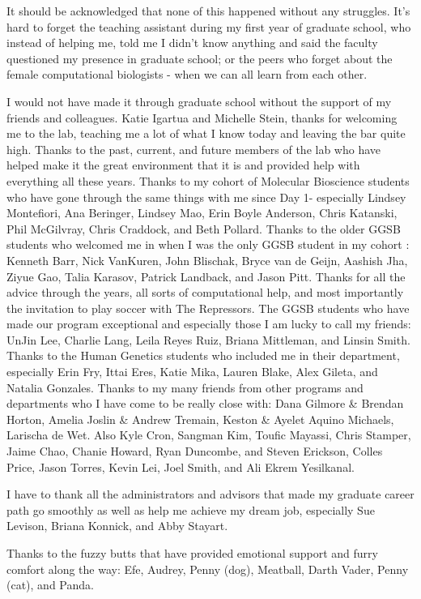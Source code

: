 It should be acknowledged that none of this happened without any struggles. It's hard to forget the teaching assistant during my first year of graduate school, who instead of helping me, told me I didn't know anything and said the faculty questioned my presence in graduate school; or the peers who forget about the female computational biologists - when we can all learn from each other.

I would not have made it through graduate school without the support of my friends and colleagues. Katie Igartua and Michelle Stein, thanks for welcoming me to the lab, teaching me a lot of what I know today and leaving the bar quite high. Thanks to the past, current, and future members of the lab who have helped make it the great environment that it is and provided help with everything all these years. Thanks to my cohort of Molecular Bioscience students who have gone through the same things with me since Day 1- especially Lindsey Montefiori, Ana Beringer, Lindsey Mao, Erin Boyle Anderson, Chris Katanski, Phil McGilvray, Chris Craddock, and Beth Pollard. Thanks to the older GGSB students who welcomed me in when I was the only GGSB student in my cohort : Kenneth Barr, Nick VanKuren, John Blischak, Bryce van de Geijn, Aashish Jha, Ziyue Gao, Talia Karasov, Patrick Landback, and Jason Pitt. Thanks for all the advice through the years, all sorts of computational help, and most importantly the invitation to play soccer with The Repressors. The GGSB students who have made our program exceptional and especially those I am lucky to call my friends: UnJin Lee, Charlie Lang, Leila Reyes Ruiz, Briana Mittleman, and Linsin Smith. Thanks to the Human Genetics students who included me in their department, especially Erin Fry, Ittai Eres, Katie Mika, Lauren Blake, Alex Gileta, and Natalia Gonzales. 
Thanks to my many friends from other programs and departments who I have come to be really close with: Dana Gilmore \& Brendan Horton, Amelia Joslin \& Andrew Tremain, Keston \& Ayelet Aquino Michaels, Larischa de Wet. Also Kyle Cron, Sangman Kim, Toufic Mayassi, Chris Stamper, Jaime Chao, Chanie Howard, Ryan Duncombe, and Steven Erickson, Colles Price, Jason Torres, Kevin Lei, Joel Smith, and Ali Ekrem Yesilkanal. 

I have to thank all the administrators and advisors that made my graduate career path go smoothly as well as help me achieve my dream job, especially Sue Levison, Briana Konnick, and Abby Stayart. 

Thanks to the fuzzy butts that have provided emotional support and furry comfort along the way: Efe, Audrey, Penny (dog), Meatball, Darth Vader, Penny (cat), and Panda.

